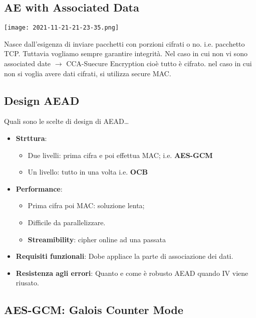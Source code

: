 \documentclass{article}
\theoremstyle{remark}
\begin{document}
\subsection{AE with Associated Data}
\begin{center}
    \texttt{[image: 2021-11-21-21-23-35.png]}
\end{center}
Nasce dall'esigenza di inviare pacchetti con porzioni cifrati o no. i.e. pacchetto TCP. Tuttavia vogliamo sempre garantire
integrità.\newline
Nel caso in cui non vi sono associated date $\rightarrow$ CCA-Suecure Encryption cioè tutto è cifrato. nel caso in cui non si
voglia avere dati cifrati, si utilizza secure MAC.
\subsection{Design AEAD}
Quali sono le scelte di design di AEAD\dots
\begin{itemize}
        \item \textbf{Strttura}: \begin{itemize}
        \item Due livelli: prima cifra e poi effettua MAC; i.e. \textbf{AES-GCM}
        \item Un livello: tutto in una volta i.e. \textbf{OCB}
         \end{itemize}
        \item \textbf{Performance}: \begin{itemize}
        \item Prima cifra poi MAC: soluzione lenta;
        \item Difficile da parallelizzare.
        \item \textbf{Streamibility}: cipher online ad una passata
    \end{itemize}
    \item \textbf{Requisiti funzionali}: Dobe appliace la parte di associazione dei dati.
    \item \textbf{Resistenza agli errori}: Quanto e come è robusto AEAD quando IV viene riusato.
\end{itemize}
\subsection{AES-GCM: Galois Counter Mode}
\end{document}
